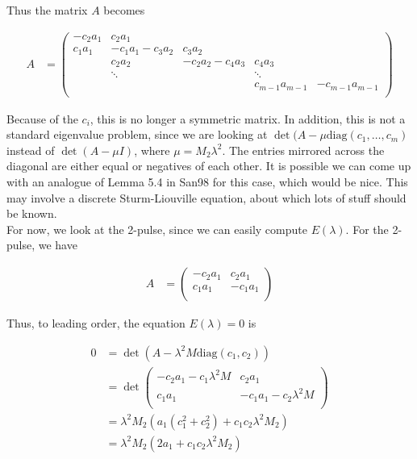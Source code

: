 \documentclass[12pt]{article}
\begin{document}
Thus the matrix $A$ becomes

\begin{align*}
A &= \begin{pmatrix}
-c_2 a_1 & c_2 a_1 & & &  \\
c_1 a_1 & -c_1 a_1 - c_3 a_2 & c_3 a_2 \\
& c_2 a_2 & -c_2 a_2 - c_4 a_3 & c_4 a_3 \\
& \ddots & & \ddots \\
& & & c_{m-1} a_{m-1} & -c_{m-1} a_{m-1}  \\
\end{pmatrix}
\end{align*}

Because of the $c_i$, this is no longer a symmetric matrix. In addition, this is not a standard eigenvalue problem, since we are looking at $\det(A - 
\mu \text{diag}(c_1, \dots, c_m)$ instead of $\det(A - \mu I)$, where $\mu = M_2 \lambda^2$. The entries mirrored across the diagonal are either equal or negatives of each other. It is possible we can come up with an analogue of Lemma 5.4 in San98 for this case, which would be nice. This may involve a discrete Sturm-Liouville equation, about which lots of stuff should be known.
\\

For now, we look at the 2-pulse, since we can easily compute $E(\lambda)$. For the 2-pulse, we have

\begin{align*}
A &= \begin{pmatrix}
-c_2 a_1 & c_2 a_1 \\
c_1 a_1 & -c_1 a_1  \\
\end{pmatrix}
\end{align*}

Thus, to leading order, the equation $E(\lambda) = 0$ is 

\begin{align*}
0 &= \det(A - \lambda^2 M \text{diag}(c_1, c_2) ) \\
&= \det \begin{pmatrix}
-c_2 a_1 - c_1 \lambda^2 M & c_2 a_1 \\
c_1 a_1 & -c_1 a_1 - c_2 \lambda^2 M \\
\end{pmatrix} \\
&= \lambda^2 M_2 ( a_1 (c_1^2 + c_2^2) + c_1 c_2 \lambda^2 M_2) \\
&= \lambda^2 M_2 ( 2 a_1 + c_1 c_2 \lambda^2 M_2)
\end{align*}
\end{document}

